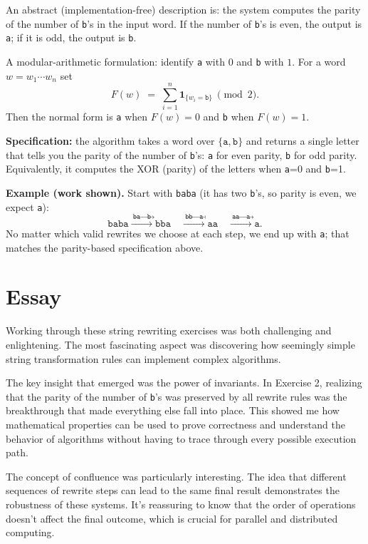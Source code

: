 \documentclass{article}
\theoremstyle{plain}
\theoremstyle{definition}
\theoremstyle{remark}
\begin{document}
\begin{enumerate}[label=(\alph*)]
  An abstract (implementation-free) description is: the system computes the parity of the number of \texttt{b}'s in the input word. If the number of \texttt{b}'s is even, the output is \texttt{a}; if it is odd, the output is \texttt{b}.
  
  A modular-arithmetic formulation: identify \texttt{a} with $0$ and \texttt{b} with $1$. For a word $w=w_1\cdots w_n$ set
  \[
    F(w)\;=\;\sum_{i=1}^n \mathbf{1}_{\{w_i=\texttt{b}\}}\ \pmod{2}.
  \]
  Then the normal form is \texttt{a} when $F(w)=0$ and \texttt{b} when $F(w)=1$.
  
  \textbf{Specification:} the algorithm takes a word over $\{\texttt{a},\texttt{b}\}$ and returns a single letter that tells you the parity of the number of \texttt{b}'s: \texttt{a} for even parity, \texttt{b} for odd parity. Equivalently, it computes the XOR (parity) of the letters when \texttt{a}=0 and \texttt{b}=1.
\end{enumerate}

\bigskip

\textbf{Example (work shown).} Start with \texttt{baba} (it has two \texttt{b}'s, so parity is even, we expect \texttt{a}):
\[
\texttt{baba} \xrightarrow{\ \texttt{ba}\to\texttt{b}\ } \texttt{bba}
\quad\xrightarrow{\ \texttt{bb}\to\texttt{a}\ } \texttt{aa}
\quad\xrightarrow{\ \texttt{aa}\to\texttt{a}\ } \texttt{a}.
\]
No matter which valid rewrites we choose at each step, we end up with \texttt{a}; that matches the parity-based specification above.

\section{Essay}

Working through these string rewriting exercises was both challenging and enlightening. The most fascinating aspect was discovering how seemingly simple string transformation rules can implement complex algorithms. 

The key insight that emerged was the power of invariants. In Exercise 2, realizing that the parity of the number of \texttt{b}'s was preserved by all rewrite rules was the breakthrough that made everything else fall into place. This showed me how mathematical properties can be used to prove correctness and understand the behavior of algorithms without having to trace through every possible execution path.

The concept of confluence was particularly interesting. The idea that different sequences of rewrite steps can lead to the same final result demonstrates the robustness of these systems. It's reassuring to know that the order of operations doesn't affect the final outcome, which is crucial for parallel and distributed computing.
\end{document}

